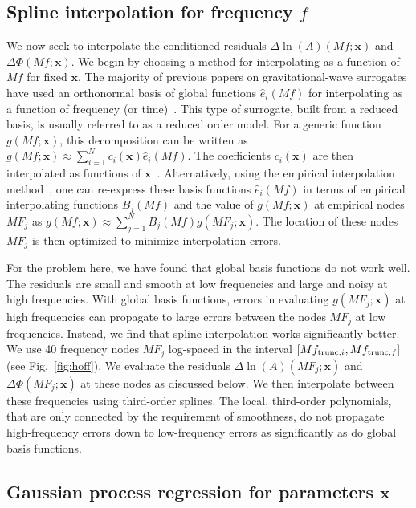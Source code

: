 \documentclass[prd,aps,letter,twocolumn,floatfix,notitlepage,nofootinbib]{revtex4-1}
\def\bx{\mathbf{x}}
\begin{document}
\subsection{Spline interpolation for frequency $f$}

We now seek to interpolate the conditioned residuals $\Delta\ln(A)(Mf; \bx)$ and $\Delta\Phi(Mf; \bx)$. We begin by choosing a method for interpolating as a function of $Mf$ for fixed $\bx$. The majority of previous papers on gravitational-wave surrogates have used an orthonormal basis of global functions $\hat e_i(Mf)$ for interpolating as a function of frequency (or time)~\cite{Puerrer2014, Puerrer2015, FieldGalleyHesthaven2014, LackeyBernuzziGalley2017, BlackmanFieldGalley2015, BlackmanFieldScheel2017a, BlackmanFieldScheel2017b}. This type of surrogate, built from a reduced basis, is usually referred to as a reduced order model. For a generic function $g(Mf; \bx)$, this decomposition can be written as $g(Mf; \bx) \approx \sum_{i=1}^N c_i(\bx) \hat e_i(Mf)$. The coefficients $c_i(\bx)$ are then interpolated as functions of $\bx$~\cite{Puerrer2014, Puerrer2015}. Alternatively, using the empirical interpolation method~\cite{Barrault2004, Chaturantabut2010, FieldGalleyHesthaven2014}, one can re-express these basis functions $\hat e_i(Mf)$ in terms of empirical interpolating functions $B_j(Mf)$ and the value of $g(Mf; \bx)$ at empirical nodes $MF_j$ as $g(Mf; \bx) \approx \sum_{j=1}^N B_j(Mf) g(MF_j; \bx)$. The location of these nodes $MF_j$ is then optimized to minimize interpolation errors.

For the problem here, we have found that global basis functions do not work well. The residuals are small and smooth at low frequencies and large and noisy at high frequencies. With global basis functions, errors in evaluating $g(MF_j;\bx)$ at high frequencies can propagate to large errors between the nodes $MF_j$ at low frequencies. Instead, we find that spline interpolation works significantly better. We use 40 frequency nodes $MF_j$ log-spaced in the interval $[Mf_{{\rm trunc}, i}, Mf_{{\rm trunc}, f}]$ (see Fig.~\ref{fig:hoff}). We evaluate the residuals $\Delta\ln(A)(MF_j; \bx)$ and $\Delta\Phi(MF_j; \bx)$ at these nodes as discussed below. We then interpolate between these frequencies using third-order splines. The local, third-order polynomials, that are only connected by the requirement of smoothness, do not propagate high-frequency errors down to low-frequency errors as significantly as do global basis functions.


\subsection{Gaussian process regression for parameters $\bx$}
\end{document}

